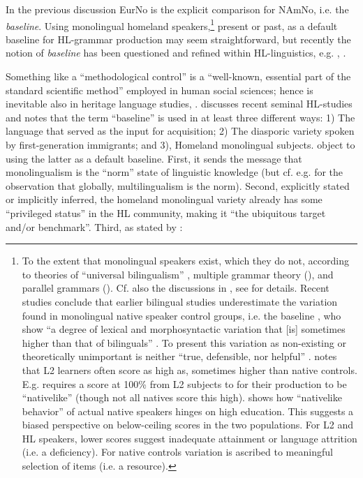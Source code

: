 \documentclass[output=paper]{langscibook}
\begin{document}
In the previous discussion EurNo is the explicit comparison for NAmNo, i.e. the \textit{baseline}. Using monolingual homeland speakers,\footnote{To the extent that monolingual speakers exist, which they do not, according to theories of “universal bilingualism” \citet{Roeper1999}, multiple grammar theory (\citealt{AmaralRoeper2014}), and parallel grammars (\citealt{EideSollid2011, EideÅfarli2020}). Cf. also the discussions in \citet{WieseEtAl2022}, see \citet{EideHjelde2023} for details. Recent studies conclude that earlier bilingual studies underestimate the variation found in monolingual native speaker control groups, i.e. the baseline \citep{DabrowskaEtAl2020}, who show “a degree of lexical and morphosyntactic variation that [is] sometimes higher than that of bilinguals” \citep{WieseEtAl2022}. To present this variation as non-existing or theoretically unimportant is neither “true, defensible, nor helpful” \citep{RothmanEtAl2023}. \citet{DabrowskaEtAl2020} notes that L2 learners often score as high as, sometimes higher than native controls. E.g. \citet{Wakabayashi1996} requires a score at 100\% from L2 subjects to for their production to be “nativelike” (though not all natives score this high). \citet{Dabrowska2012} shows how “nativelike behavior” of actual native speakers hinges on high education. This suggests a biased perspective on below-ceiling scores in the two populations. For L2 and HL speakers, lower scores suggest inadequate attainment or language attrition (i.e. a deficiency). For native controls variation is ascribed to meaningful selection of items (i.e. a resource).}   present or past, as a default baseline for HL-grammar production may seem straightforward, but recently the notion of \textit{baseline} has been questioned and refined within HL-linguistics, e.g. \citet{Polinsky2018}, \citet{AalberseEtAl2019}. 

Something like a “methodological control” is a “well-known, essential part of the standard scientific method” employed in human social sciences; hence is inevitable also in heritage language studies, \citet[317]{RothmanEtAl2023}. \citet{Serratrice2020} discusses recent seminal HL-studies and notes that the term “baseline” is used in at least three different ways: 1) The language that served as the input for acquisition; 2) The diasporic variety spoken by first-generation immigrants; and 3), Homeland monolingual subjects. \citet{RothmanEtAl2023} object to using the latter as a default baseline. First, it sends the message that monolingualism is the “norm” state of linguistic knowledge (but cf. e.g. \citet{DeHouwer2021} for the observation that globally, multilingualism is the norm). Second, explicitly stated or implicitly inferred, the homeland monolingual variety already has some “privileged status” in the HL community, making it “the ubiquitous target and/or benchmark”. Third, as stated by \citet{WieseEtAl2022}:
\end{document}
